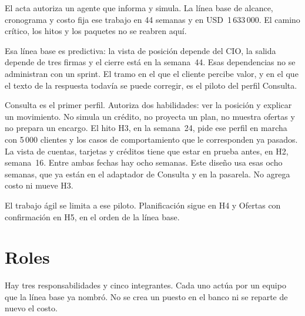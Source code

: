\documentclass[11pt,a4paper]{article}
\newcommand{\usd}[1]{USD~#1}
\begin{document}
El acta autoriza un agente que informa y simula. La línea base de alcance, cronograma y costo fija ese trabajo en 44 semanas y en \usd{1\,633\,000}. El camino crítico, los hitos y los paquetes no se reabren aquí.

Esa línea base es predictiva: la vista de posición depende del CIO, la salida depende de tres firmas y el cierre está en la semana~44. Esas dependencias no se administran con un sprint. El tramo en el que el cliente percibe valor, y en el que el texto de la respuesta todavía se puede corregir, es el piloto del perfil Consulta.

Consulta es el primer perfil. Autoriza dos habilidades: ver la posición y explicar un movimiento. No simula un crédito, no proyecta un plan, no muestra ofertas y no prepara un encargo. El hito H3, en la semana~24, pide ese perfil en marcha con 5\,000 clientes y los casos de comportamiento que le corresponden ya pasados. La vista de cuentas, tarjetas y créditos tiene que estar en prueba antes, en H2, semana~16. Entre ambas fechas hay ocho semanas. Este diseño usa esas ocho semanas, que ya están en el adaptador de Consulta y en la pasarela. No agrega costo ni mueve H3.

El trabajo ágil se limita a ese piloto. Planificación sigue en H4 y Ofertas con confirmación en H5, en el orden de la línea base.

\section{Roles}

Hay tres responsabilidades y cinco integrantes. Cada uno actúa por un equipo que la línea base ya nombró. No se crea un puesto en el banco ni se reparte de nuevo el costo.
\end{document}
